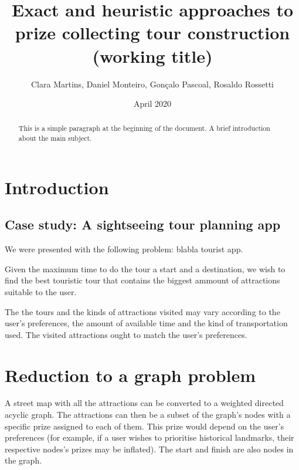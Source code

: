 \documentclass{article}
\title{Exact and heuristic approaches to prize collecting tour construction (working title)}
\author{Clara Martins, Daniel Monteiro, Gonçalo Pascoal, Rosaldo Rossetti}
\date{April 2020}
\begin{document}
\maketitle

\begin{abstract}
This is a simple paragraph at the beginning of the 
document. A brief introduction about the main subject.
\end{abstract}

\section{Introduction}

\subsection{Case study: A sightseeing tour planning app}
We were presented with the following problem: blabla tourist app. 

Given the maximum time to do the tour a start and a destination, we wish to find the best touristic tour that contains the biggest ammount of attractions suitable to the user.

The the tours and the kinds of attractions visited may vary according to the user's preferences, the amount of available time and the kind of transportation used. The visited attractions ought to match the user's preferences.

\section{Reduction to a graph problem}

A street map with all the attractions can be converted to a weighted directed acyclic graph. The attractions can then be a subset of the graph's nodes with a specific prize assigned to each of them. This prize would depend on the user's preferences (for example, if a user wishes to prioritise historical landmarks, their respective nodes's prizes may be inflated). The start and finish are also nodes in the graph. 
\end{document}
